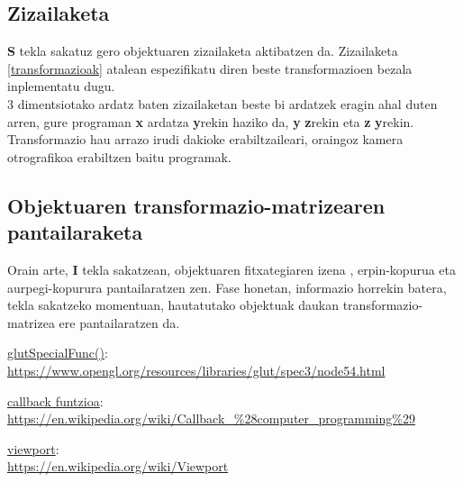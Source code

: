 \documentclass[12pt]{article}
\newcommand{\tekla}[1] {\textbf{#1}}
\begin{document}
\subsection{Zizailaketa}

\tekla{S} tekla sakatuz gero objektuaren zizailaketa aktibatzen da. Zizailaketa \ref{transformazioak} atalean espezifikatu diren beste transformazioen bezala inplementatu dugu.\\

3 dimentsiotako ardatz baten zizailaketan beste bi ardatzek eragin ahal duten arren, gure programan \textbf{x} ardatza \textbf{y}rekin haziko da, \textbf{y} \textbf{z}rekin eta \textbf{z} \textbf{y}rekin. Transformazio hau arrazo irudi dakioke erabiltzaileari, oraingoz kamera otrografikoa erabiltzen baitu programak.\\


\subsection{Objektuaren transformazio-matrizearen pantailaraketa}

Orain arte, \tekla{I} tekla sakatzean, objektuaren fitxategiaren izena , erpin-kopurua eta aurpegi-kopurura pantailaratzen zen. Fase honetan, informazio horrekin batera, tekla sakatzeko momentuan, hautatutako objektuak daukan transformazio-matrizea ere pantailaratzen da.





\begin{thebibliography}{9}

\underline{glutSpecialFunc()}:\\
\url{https://www.opengl.org/resources/libraries/glut/spec3/node54.html}

\underline{callback funtzioa}:\\
\url{https://en.wikipedia.org/wiki/Callback_%28computer_programming%29}

\underline{viewport}:\\
\url{https://en.wikipedia.org/wiki/Viewport}

\end{thebibliography}
\end{document}
